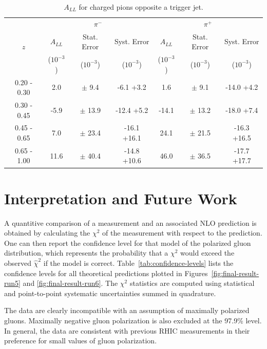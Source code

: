 \begin{table}
  \centering
  \begin{tabular}{|c||c|c|c||c|c|c|}
    \hline
    \multirow{3}{*}{$z$} & \multicolumn{3}{c||}{$\pi^{-}$} & \multicolumn{3}{c|}{$\pi^{+}$} \\
    \cline{2-7}
    & $A_{LL}$ & Stat. Error & Syst. Error &$A_{LL}$ & Stat. Error & Syst. Error\\
    & ($10^{-3}$) & ($10^{-3}$) & ($10^{-3}$) & ($10^{-3}$) & ($10^{-3}$) & ($10^{-3}$) \\
    \hline
    \hline
    0.20 - 0.30 & 2.0 & $\pm$ 9.4 & -6.1 +3.2 &  1.6 & $\pm$ 9.1 & -14.0 +4.2\\
    0.30 - 0.45 & -5.9 & $\pm$ 13.9 & -12.4 +5.2 &  -14.1 & $\pm$ 13.2 & -18.0 +7.4\\
    0.45 - 0.65 & 7.0 & $\pm$ 23.4 & -16.1 +16.1 &  24.1 & $\pm$ 21.5 & -16.3 +16.5\\
    0.65 - 1.00 & 11.6 & $\pm$ 40.4 & -14.8 +10.6 &  46.0 & $\pm$ 36.5 & -17.7 +17.7\\
    \hline
  \end{tabular}
  \caption{$A_{LL}$ for charged pions opposite a trigger jet.}
  \label{tab:final-2006-result}
\end{table}

\section{Interpretation and Future Work}

A quantitive comparison of a measurement and an associated NLO prediction is obtained by calculating the \(\chi^2\) of the measurement with respect to the prediction.  One can then report the confidence level for that model of the polarized gluon distribution, which represents the probability that a \(\chi^2\) would exceed the observed \(\hat{\chi}^2\) if the model is correct.  Table~\ref{tab:confidence-levels} lists the confidence levels for all theoretical predictions plotted in Figures~\ref{fig:final-result-run5} and \ref{fig:final-result-run6}.  The \(\chi^2\) statistics are computed using statistical and point-to-point systematic uncertainties summed in quadrature.

The data are clearly incompatible with an assumption of maximally polarized gluons.  Maximally negative gluon polarization is also excluded at the 97.9\% level.  In general, the data are consistent with previous RHIC measurements in their preference for small values of gluon polarization.

